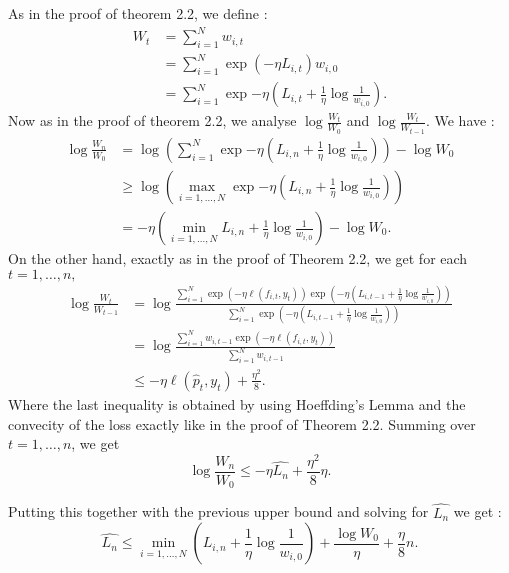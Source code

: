 \begin{solution}[]
	As in the proof of theorem 2.2, we define :
\begin{align*}
	W_t &= \sum_{i=1}^{N}w_{i,t} \\
	    &= \sum_{i=1}^{N}\exp{(-\eta L_{i,t})}w_{i,0} \\
	    &= \sum_{i=1}^{N}\exp{-\eta \left(L_{i,t} + \frac{1}{\eta}\log \frac{1}{w_{i,0}}\right)}.
\end{align*}
Now as in the proof of theorem 2.2, we analyse $ \log \frac{W_t}{W_0} $ and $ \log \frac{W_t}{W_{t-1}} $.
We have :
\begin{align*}
	\log \frac{W_n}{W_0} &= \log \left( \sum_{i=1}^{N}\exp{-\eta \left(L_{i,n} + \frac{1}{\eta}\log \frac{1}{w_{i,0}}\right)} \right) - \log W_0 \\
			     &\geq \log \left( \max_{i=1,\ldots,N}\exp{-\eta \left(L_{i,n} + \frac{1}{\eta}\log \frac{1}{w_{i,0}}\right)} \right) \\
			     &= - \eta \left( \min_{i=1,\ldots,N}L_{i,n} + \frac{1}{\eta}\log \frac{1}{w_{i,0}} \right) - \log W_0.
\end{align*}
On the other hand, exactly as in the proof of Theorem 2.2, we get for each $ t=1,\ldots,n, $
\begin{align*}
	\log \frac{W_t}{W_{t-1}} &= \log \frac{\sum_{i=1}^{N}\exp{(-\eta\ell(f_{i,t},y_t))}\exp{\left( -\eta \left( L_{i,t-1} + \frac{1}{\eta}\log \frac{1}{w_{i,0}} \right) \right)}}{\sum_{i=1}^{N}\exp{\left( -\eta \left( L_{i,t-1} + \frac{1}{\eta}\log \frac{1}{w_{i,0}} \right) \right)}} \\
				 &= \log \frac{\sum_{i=1}^{N}w_{i,t-1}\exp{(-\eta\ell(f_{i,t},y_t))}}{\sum_{i=1}^{N}w_{i,t-1}} \\
				 &\leq -\eta\ell(\hat{p}_t,y_t) + \frac{\eta^2}{8}.
\end{align*}
Where the last inequality is obtained by using Hoeffding's Lemma and the convecity of the loss exactly like in the proof of Theorem 2.2.
Summing over $ t=1,\ldots,n $, we get
\begin{equation*}
	\log \frac{W_n}{W_0} \leq -\eta\widehat{L_n} + \frac{\eta^2}{8} \eta .
\end{equation*}

Putting this together with the previous upper bound and solving for $ \widehat{L_n} $ we get :
\begin{equation*}
	\widehat{L_n} \leq \min_{i=1,\ldots,N} \left( L_{i,n} + \frac{1}{\eta}\log \frac{1}{w_{i,0}} \right) + \frac{\log W_0}{\eta} + \frac{\eta}{8}n.
\end{equation*}

\end{solution}
